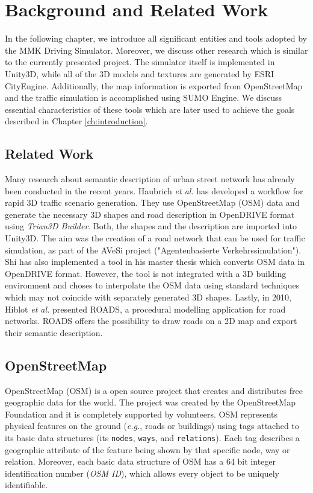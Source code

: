 \chapter{Background and Related Work}
\label{ch:background}
In the following chapter, we introduce all significant entities and tools adopted by the MMK Driving Simulator. Moreover, we discuss other research which is similar to the currently presented project. The simulator itself is implemented in Unity3D\cite{unity}, while all of the 3D models and textures are generated by ESRI CityEngine\cite{ce}. Additionally, the map information is exported from OpenStreetMap\cite{osm} and the traffic simulation is accomplished using SUMO Engine\cite{sumo}. We discuss essential characteristics of these tools which are later used to achieve the goals described in Chapter \ref{ch:introduction}. 

\section{Related Work}
Many research about semantic description of urban street network has already been conducted in the recent years. Haubrich \emph{et al.} has developed a workflow for rapid 3D traffic scenario generation\cite{haubrich2013semantic}. They use OpenStreetMap (OSM) data and generate the necessary 3D shapes and road description in OpenDRIVE format using \emph{Trian3D Builder}. Both, the shapes and the description are imported into Unity3D. The aim was the creation of a road network that can be used for traffic simulation, as part of the AVeSi project ("Agentenbasierte Verkehrssimulation"). Shi has also implemented a tool in his master thesis\cite{shi2011automatic} which converts OSM data in OpenDRIVE format. However, the tool is not integrated with a 3D building environment and choses to interpolate the OSM data using standard techniques which may not coincide with separately generated 3D shapes. Lastly, in 2010, Hiblot \emph{et al.} presented ROADS\cite{hiblot2010pro}, a procedural modelling application for road networks. ROADS offers the possibility to draw roads on a 2D map and export their semantic description.  

\section{OpenStreetMap}
\label{ch:osm}
OpenStreetMap (OSM) is a open source project that creates and distributes free geographic data for the world. The project was created by the OpenStreetMap Foundation and it is completely supported by volunteers. OSM represents physical features on the ground (\emph{e.g.}, roads or buildings) using tags attached to its basic data structures (its \texttt{nodes}, \texttt{ways}, and \texttt{relations}). Each tag describes a geographic attribute of the feature being shown by that specific node, way or relation. Moreover, each basic data structure of OSM has a 64 bit integer identification number (\emph{OSM ID}), which allows every object to be uniquely identifiable.

